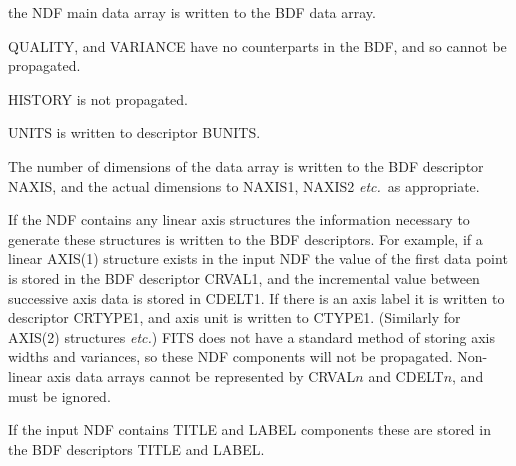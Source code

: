 {{{         \sstitem
            the NDF main data array is written to the BDF data array.

         \sstitem
            QUALITY, and VARIANCE have no counterparts in the BDF, and
            so cannot be propagated.

         \sstitem
            HISTORY is not propagated.

         \sstitem
            UNITS is written to descriptor BUNITS.

         \sstitem
            The number of dimensions of the data array is written
            to the BDF descriptor NAXIS, and the actual dimensions to
            NAXIS1, NAXIS2 {\it etc.}\ as appropriate.

         \sstitem
            If the NDF contains any linear axis structures the
            information necessary to generate these structures is
            written to the BDF descriptors. For example, if a linear
            AXIS(1) structure exists in the input NDF the value of the
            first data point is stored in the BDF descriptor CRVAL1,
            and the incremental value between successive axis data is
            stored in CDELT1. If there is an axis label it is written to
            descriptor CRTYPE1, and axis unit is written to CTYPE1.
            (Similarly for AXIS(2) structures {\it etc.}) FITS does not have a
            standard method of storing axis widths and variances, so these
            NDF components will not be propagated.  Non-linear axis data
            arrays cannot be represented by CRVAL$n$ and CDELT$n$, and must be
            ignored.

         \sstitem
            If the input NDF contains TITLE and LABEL components these
            are stored in the BDF descriptors TITLE and LABEL.

}}}
